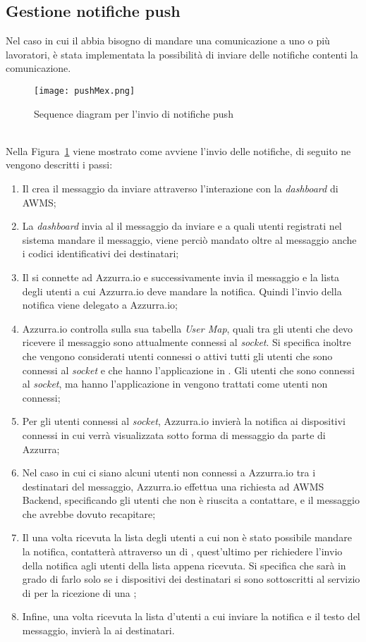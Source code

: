 \subsection{Gestione notifiche push}
Nel caso in cui il  abbia bisogno di mandare una comunicazione a uno o più lavoratori, è stata implementata la possibilità di inviare delle notifiche contenti la comunicazione.
\begin{figure}[h]
	\begin{center}
		\texttt{[image: pushMex.png]}
		\caption{Sequence diagram per l'invio di notifiche push}\label{fig:push}
	\end{center}
\end{figure}\\
Nella Figura~\ref{fig:push} viene mostrato come avviene l'invio delle notifiche, di seguito ne vengono descritti i passi:
\begin{enumerate}
	\item Il  crea il messaggio da inviare attraverso l'interazione con la \emph{dashboard} di \gls{AWMS};
	\item La \emph{dashboard} invia al  il messaggio da inviare e a quali utenti registrati nel sistema mandare il messaggio, viene perciò mandato oltre al messaggio anche i codici identificativi dei destinatari;
	\item Il  si connette ad Azzurra.io e successivamente invia il messaggio e la lista degli utenti a cui Azzurra.io deve mandare la notifica. Quindi l'invio della notifica viene delegato a Azzurra.io; 
	\item Azzurra.io controlla sulla sua tabella \emph{User Map}, quali tra gli utenti che devo ricevere il messaggio sono attualmente connessi al \emph{socket}. Si specifica inoltre che vengono considerati utenti connessi o attivi tutti gli utenti che sono connessi al \emph{socket} e che hanno l’applicazione in . Gli utenti che sono connessi al \emph{socket}, ma hanno l’applicazione in  vengono trattati come utenti non connessi;
	\item Per gli utenti connessi al \emph{socket}, Azzurra.io invierà la notifica ai dispositivi connessi in cui verrà visualizzata sotto forma di messaggio da parte di Azzurra;
	\item Nel caso in cui ci siano alcuni utenti non connessi a Azzurra.io tra i destinatari del messaggio, Azzurra.io effettua una richiesta  ad AWMS Backend, specificando gli utenti che non è riuscita a contattare, e il messaggio che avrebbe dovuto recapitare;
	\item Il  una volta ricevuta la lista degli utenti a cui non è stato possibile mandare la notifica, contatterà attraverso un  di , quest'ultimo per richiedere l'invio della notifica agli utenti della lista appena ricevuta. Si specifica che  sarà in grado di farlo solo se i dispositivi dei destinatari si sono sottoscritti al servizio di  per la ricezione di una ;
	\item Infine,  una volta ricevuta la lista d'utenti a cui inviare la notifica e il testo del messaggio, invierà la  ai destinatari.
\end{enumerate}